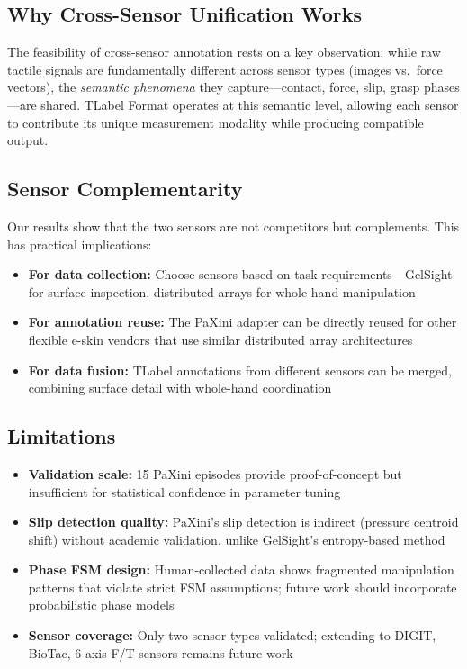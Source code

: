 \documentclass[conference]{IEEEtran}
\begin{document}
\subsection{Why Cross-Sensor Unification Works}

The feasibility of cross-sensor annotation rests on a key observation: while raw tactile signals are fundamentally different across sensor types (images vs.\ force vectors), the \emph{semantic phenomena} they capture---contact, force, slip, grasp phases---are shared. TLabel Format operates at this semantic level, allowing each sensor to contribute its unique measurement modality while producing compatible output.

\subsection{Sensor Complementarity}

Our results show that the two sensors are not competitors but complements. This has practical implications:
\begin{itemize}
\item \textbf{For data collection:} Choose sensors based on task requirements---GelSight for surface inspection, distributed arrays for whole-hand manipulation
\item \textbf{For annotation reuse:} The PaXini adapter can be directly reused for other flexible e-skin vendors that use similar distributed array architectures
\item \textbf{For data fusion:} TLabel annotations from different sensors can be merged, combining surface detail with whole-hand coordination
\end{itemize}

\subsection{Limitations}

\begin{itemize}
\item \textbf{Validation scale:} 15 PaXini episodes provide proof-of-concept but insufficient for statistical confidence in parameter tuning
\item \textbf{Slip detection quality:} PaXini's slip detection is indirect (pressure centroid shift) without academic validation, unlike GelSight's entropy-based method
\item \textbf{Phase FSM design:} Human-collected data shows fragmented manipulation patterns that violate strict FSM assumptions; future work should incorporate probabilistic phase models
\item \textbf{Sensor coverage:} Only two sensor types validated; extending to DIGIT, BioTac, 6-axis F/T sensors remains future work
\end{itemize}
\end{document}
